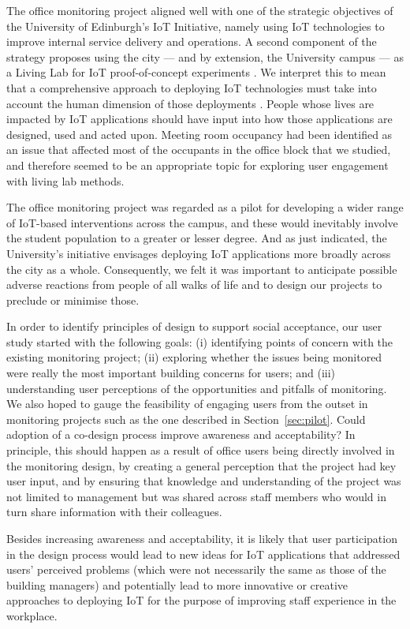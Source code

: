 The office monitoring project aligned well with one of the strategic
objectives of the University of Edinburgh's IoT Initiative, namely
using IoT technologies to improve internal service delivery and
operations. A second component of the strategy proposes using the city
--- and by extension, the University campus --- as a Living Lab for
IoT proof-of-concept experiments \cite{IoT-Strategy}. We interpret
this to mean that a comprehensive approach to deploying IoT
technologies must take into account the human dimension of those
deployments \cite{Shin-2017-UTIO}.  People whose lives are
impacted by IoT applications should have input into how those
applications are designed, used and acted upon. Meeting room occupancy
had been identified as an issue that affected most of the occupants in
the office block that we studied, and therefore seemed to be an
appropriate topic for exploring user engagement with living lab
methods. 

The office monitoring project was regarded as a pilot for
developing a wider range of IoT-based interventions across the campus,
and these would inevitably involve the student population to a greater
or lesser degree. And as just indicated, the University's initiative
envisages deploying IoT applications more broadly across the city as a
whole. Consequently, we felt it was important to anticipate possible
adverse reactions from people of all walks of life and to design our
projects to preclude or minimise those.  

In order to identify principles of design to support social
acceptance, our user study started with the following goals: (i)
identifying points of concern with the existing monitoring project;
(ii) exploring whether the issues being monitored were really the most
important building concerns for users; and (iii) understanding user
perceptions of the opportunities and pitfalls of monitoring.  We also
hoped to gauge the feasibility of engaging users from the outset in
monitoring projects such as the one described in
Section~\ref{sec:pilot}. Could adoption of a co-design process improve
awareness and acceptability? In principle, this should happen as a
result of office users being directly involved in the monitoring
design, by creating a general perception that the project had key user
input, and by ensuring that knowledge and understanding of the project
was not limited to management but was shared across staff members who
would in turn share information with their colleagues.

Besides increasing awareness and acceptability, it is likely that user
participation in the design process would lead to new ideas for IoT
applications that addressed users’ perceived problems (which were not
necessarily the same as those of the building managers) and
potentially lead to more innovative or creative approaches to
deploying IoT for the purpose of improving staff experience in
the workplace.  

